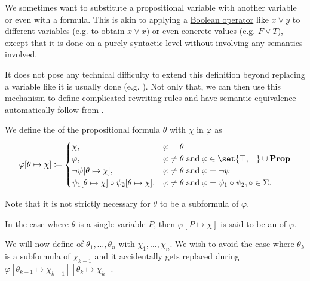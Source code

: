 \begin{definition}\label{def:propositional_substitution}\mimprovised
  We sometimes want to substitute a propositional variable with another variable or even with a formula. This is akin to applying a \hyperref[def:boolean_operator]{Boolean operator} like \( x \vee y \) to different variables (e.g. to obtain \( x \vee x \)) or even concrete values (e.g. \( F \vee T \)), except that it is done on a purely syntactic level without involving any semantics involved.

  It does not pose any technical difficulty to extend this definition beyond replacing a variable like it is usually done (e.g. \cite[def. 1.2.5]{VanDalen2004}). Not only that, we can then use this mechanism to define complicated rewriting rules and have semantic equivalence automatically follow from .

  \begin{thmenum}
     We define the  of the propositional formula \( \theta \) with \( \chi \) in \( \varphi \) as
    \begin{equation}\label{eq:def:propositional_substitution/single}
      \varphi[\theta \mapsto \chi] \coloneqq \begin{cases}
        \chi,                                                             &\varphi = \theta \\
        \varphi,                                                          &\varphi \neq \theta \T{and} \varphi \in \set{ \top, \bot } \cup \boldop{Prop} \\
        \neg \psi[\theta \mapsto \chi],                                   &\varphi \neq \theta \T{and} \varphi = \neg \psi \\
        \psi_1[\theta \mapsto \chi] \bincirc \psi_2[\theta \mapsto \chi], &\varphi \neq \theta \T{and} \varphi = \psi_1 \bincirc \psi_2, \circ \in \Sigma.
      \end{cases}
    \end{equation}

    Note that it is not strictly necessary for \( \theta \) to be a subformula of \( \varphi \).

    In the case where \( \theta \) is a single variable \( P \), then \( \varphi[P \mapsto \chi] \) is said to be an  of \( \varphi \).

     We will now define  of \( \theta_1, \ldots, \theta_n \) with \( \chi_1, \ldots, \chi_n \). We wish to avoid the case where \( \theta_k \) is a subformula of \( \chi_{k-1} \) and it accidentally gets replaced during \( \varphi[\theta_{k-1} \mapsto \chi_{k-1}][\theta_k \mapsto \chi_k] \).


\end{thmenum}
\end{definition}

